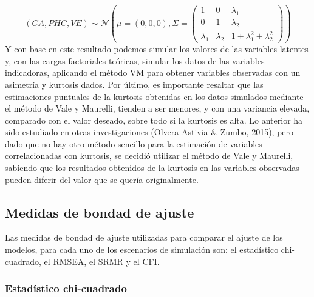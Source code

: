\documentclass[
  english]{revcoles}
\begin{document}
\[
    (CA, PHC, VE) \sim \mathcal{N} \left(\mu = (0, 0, 0), \Sigma = \begin{pmatrix}
        1         & 0         & \lambda_1                     \\
        0         & 1         & \lambda_2                     \\
        \lambda_1 & \lambda_2 & 1 + \lambda_1^2 + \lambda_2^2
    \end{pmatrix} \right)
\] Y con base en este resultado podemos simular los valores de las
variables latentes y, con las cargas factoriales teóricas, simular los
datos de las variables indicadoras, aplicando el método VM para obtener
variables observadas con un asimetría y kurtosis dados. Por último, es
importante resaltar que las estimaciones puntuales de la kurtosis
obtenidas en los datos simulados mediante el método de Vale y Maurelli,
tienden a ser menores, y con una variancia elevada, comparado con el
valor deseado, sobre todo si la kurtosis es alta. Lo anterior ha sido
estudiado en otras investigaciones (Olvera Astivia \& Zumbo,
\protect\hyperlink{ref-OlveraAstivia2015}{2015}), pero dado que no hay
otro método sencillo para la estimación de variables correlacionadas con
kurtosis, se decidió utilizar el método de Vale y Maurelli, sabiendo que
los resultados obtenidos de la kurtosis en las variables observadas
pueden diferir del valor que se quería originalmente.

\subsection{Medidas de bondad de ajuste}

Las medidas de bondad de ajuste utilizadas para comparar el ajuste de
los modelos, para cada uno de los escenarios de simulación son: el
estadístico chi-cuadrado, el RMSEA, el SRMR y el CFI.

\subsubsection{Estadístico chi-cuadrado}
\end{document}
